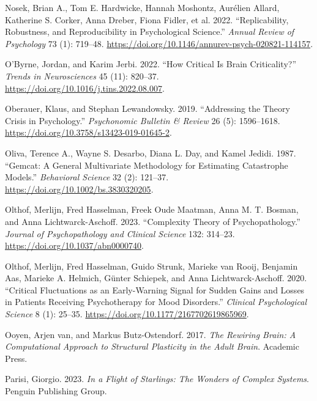 \documentclass[
  a4paper,
  DIV=11,
  numbers=noendperiod,
  oneside]{scrreprt}
\newlength{\cslhangindent}
\newenvironment{CSLReferences}[2] %
 {\begin{list}{}{%
  \setlength{\itemindent}{0pt}
  \setlength{\leftmargin}{0pt}
  \setlength{\parsep}{0pt}
  \ifodd #1
   \setlength{\leftmargin}{\cslhangindent}
   \setlength{\itemindent}{-1\cslhangindent}
  \fi
  \setlength{\itemsep}{#2\baselineskip}}}
 {\end{list}}
\begin{document}
\begin{CSLReferences}{1}{0}
Nosek, Brian A., Tom E. Hardwicke, Hannah Moshontz, Aurélien Allard,
Katherine S. Corker, Anna Dreber, Fiona Fidler, et al. 2022.
{``Replicability, {Robustness}, and {Reproducibility} in {Psychological
Science}.''} \emph{Annual Review of Psychology} 73 (1): 719--48.
\url{https://doi.org/10.1146/annurev-psych-020821-114157}.

O'Byrne, Jordan, and Karim Jerbi. 2022. {``How Critical Is Brain
Criticality?''} \emph{Trends in Neurosciences} 45 (11): 820--37.
\url{https://doi.org/10.1016/j.tins.2022.08.007}.

Oberauer, Klaus, and Stephan Lewandowsky. 2019. {``Addressing the Theory
Crisis in Psychology.''} \emph{Psychonomic Bulletin \& Review} 26 (5):
1596--1618. \url{https://doi.org/10.3758/s13423-019-01645-2}.

Oliva, Terence A., Wayne S. Desarbo, Diana L. Day, and Kamel Jedidi.
1987. {``Gemcat: {A} General Multivariate Methodology for Estimating
Catastrophe Models.''} \emph{Behavioral Science} 32 (2): 121--37.
\url{https://doi.org/10.1002/bs.3830320205}.

Olthof, Merlijn, Fred Hasselman, Freek Oude Maatman, Anna M. T. Bosman,
and Anna Lichtwarck-Aschoff. 2023. {``Complexity Theory of
Psychopathology.''} \emph{Journal of Psychopathology and Clinical
Science} 132: 314--23. \url{https://doi.org/10.1037/abn0000740}.

Olthof, Merlijn, Fred Hasselman, Guido Strunk, Marieke van Rooij,
Benjamin Aas, Marieke A. Helmich, Günter Schiepek, and Anna
Lichtwarck-Aschoff. 2020. {``Critical {Fluctuations} as an
{Early-Warning Signal} for {Sudden Gains} and {Losses} in {Patients
Receiving Psychotherapy} for {Mood Disorders}.''} \emph{Clinical
Psychological Science} 8 (1): 25--35.
\url{https://doi.org/10.1177/2167702619865969}.

Ooyen, Arjen van, and Markus Butz-Ostendorf. 2017. \emph{The {Rewiring
Brain}: {A Computational Approach} to {Structural Plasticity} in the
{Adult Brain}}. {Academic Press}.

Parisi, Giorgio. 2023. \emph{In a Flight of Starlings: The Wonders of
Complex Systems}. Penguin Publishing Group.


\end{CSLReferences}
\end{document}
